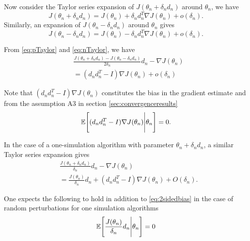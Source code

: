 \documentclass[letterpaper, 10 pt, conference]{ieeeconf}  %
\begin{document}
Now consider the Taylor series expansion of $J(\theta_n+\delta_nd_n)$ around
$\theta_n$, we have
\begin{equation} \label{eq:pTaylor}
J(\theta_n+\delta_nd_n)=
J(\theta_n)+\delta_nd_n^T \nabla J(\theta_n)+o(\delta_n).
\end{equation}
Similarly, an expansion of $J(\theta_n-\delta_n d_n)$ around $\theta_n$ gives
\begin{equation} \label{eq:nTaylor}
J(\theta_n-\delta_n d_n)=
J(\theta_n)-\delta_n d_n^T \nabla J(\theta_n)+o(\delta_n).
\end{equation}

From \eqref{eq:pTaylor} and \eqref{eq:nTaylor}, we have
\begin{align}\label{eq:Taylor}
&\frac{J(\theta_n+\delta_n d_n)-J(\theta_n-\delta_n d_n)}{2\delta_n}d_n
- \nabla J(\theta_n) \\
&= (d_nd_n^T-I)\nabla J(\theta_n)+o(\delta_n)
\end{align}

Note that $(d_nd_n^T-I)\nabla J(\theta_n)$ constitutes the bias in the
gradient estimate and
from the assumption A3 in section \ref{sec:convergenceresults}
\begin{equation}\label{eq:2sidedbias}
\mathbb{E}\Bigg{[}(d_nd_n^T-I)\nabla J(\theta_n)\Bigg{|}\theta_n\Bigg{]}=0.
\end{equation}

In the case of a one-simulation algorithm with parameter $\theta_n+\delta_n d_n$,
a similar Taylor series expansion gives
\begin{align}\label{eq:1sided}
&\frac{J(\theta_n+\delta_n d_n)}{\delta_n}d_n
- \nabla J(\theta_n) \\
&=\frac{J(\theta_n)}{\delta_n}d_n
+(d_nd_n^T-I)\nabla J(\theta_n)+O(\delta_n).
\end{align}

One expects the following to hold in addition to \eqref{eq:2sidedbias} in the case of 
random perturbations for one simulation algorithms
\begin{equation}\label{eq:1sidedbias}
\mathbb{E}\Bigg{[}\frac{J(\theta_n)}{\delta_n}d_n\Bigg{|}\theta_n\Bigg{]}=0 
\end{equation}
\end{document}
